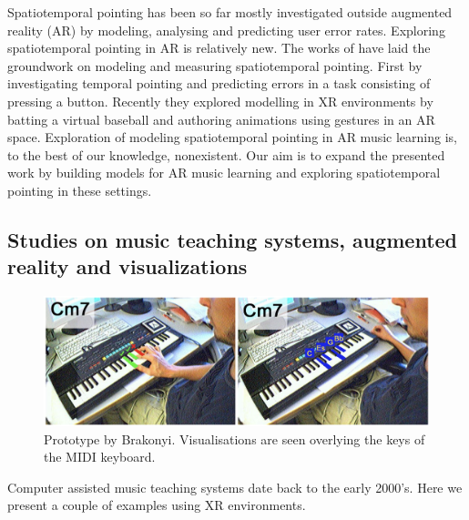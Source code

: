 \documentclass[manuscript,screen]{acmart}
\begin{document}
Spatiotemporal pointing has been so far mostly investigated outside augmented reality (AR) by modeling, analysing and predicting user error rates. Exploring spatiotemporal pointing in AR is relatively new. The works of \citet{liao2020button, lee2019geometrically, arora2019magicalhands} have laid the groundwork on modeling and measuring spatiotemporal pointing. First by investigating temporal pointing and predicting errors in a task consisting of pressing a button. Recently they explored modelling in XR environments by batting a virtual baseball and authoring animations using gestures in an AR space. Exploration of modeling spatiotemporal pointing in AR music learning is, to the best of our knowledge, nonexistent. Our aim is to expand the presented work by building models for AR music learning and exploring spatiotemporal pointing in these settings. 

\subsection{Studies on music teaching systems, augmented reality and visualizations}

\begin{figure}[h]
\centering
 \includegraphics[width=12cm]{figures/barakonyi.png}
    \caption{Prototype by Brakonyi. Visualisations are seen overlying the keys of the MIDI keyboard.
    }\label{fig:barakonyi}
\end{figure}

Computer assisted music teaching systems date back to the early 2000’s. Here we present a couple of examples using XR environments. 
\end{document}
